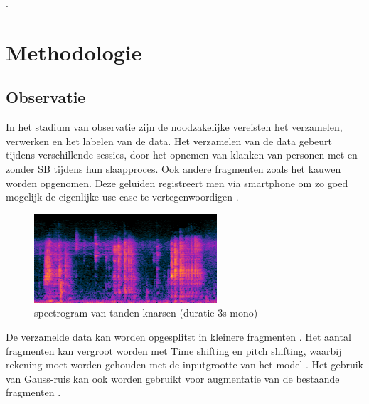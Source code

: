 \documentclass{hogent-article}
\begin{document}
.


\section{Methodologie}

\subsection{Observatie}

In het stadium van observatie zijn de noodzakelijke vereisten het verzamelen, verwerken en het labelen van de data. Het verzamelen van de data gebeurt tijdens verschillende sessies, door het opnemen van  klanken van personen met en zonder SB tijdens hun slaapproces.  Ook andere fragmenten zoals het kauwen worden opgenomen. Deze geluiden registreert men via smartphone om zo goed mogelijk de eigenlijke use case te vertegenwoordigen .



\begin{figure}[h!]
    \centering
    \includegraphics[width=0.7\linewidth]{brux_spec}
    \caption{ spectrogram van tanden knarsen (duratie 3s mono)}
    \label{fig:mil spectrogram of teeth grinding (duration 3s)}
\end{figure}

De verzamelde data kan worden opgesplitst in kleinere fragmenten .
Het aantal fragmenten kan vergroot worden met Time shifting en pitch shifting, waarbij rekening moet worden gehouden met de inputgrootte van het model . Het gebruik van Gauss-ruis kan ook worden gebruikt voor augmentatie van de bestaande fragmenten .
\end{document}
